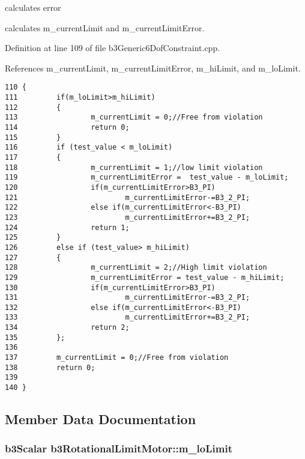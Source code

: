 calculates error 

calculates m\_\-currentLimit and m\_\-currentLimitError. 

Definition at line 109 of file b3Generic6DofConstraint.cpp.

References m\_\-currentLimit, m\_\-currentLimitError, m\_\-hiLimit, and m\_\-loLimit.

\begin{Code}\begin{verbatim}110 {
111         if(m_loLimit>m_hiLimit)
112         {
113                 m_currentLimit = 0;//Free from violation
114                 return 0;
115         }
116         if (test_value < m_loLimit)
117         {
118                 m_currentLimit = 1;//low limit violation
119                 m_currentLimitError =  test_value - m_loLimit;
120                 if(m_currentLimitError>B3_PI) 
121                         m_currentLimitError-=B3_2_PI;
122                 else if(m_currentLimitError<-B3_PI) 
123                         m_currentLimitError+=B3_2_PI;
124                 return 1;
125         }
126         else if (test_value> m_hiLimit)
127         {
128                 m_currentLimit = 2;//High limit violation
129                 m_currentLimitError = test_value - m_hiLimit;
130                 if(m_currentLimitError>B3_PI) 
131                         m_currentLimitError-=B3_2_PI;
132                 else if(m_currentLimitError<-B3_PI) 
133                         m_currentLimitError+=B3_2_PI;
134                 return 2;
135         };
136 
137         m_currentLimit = 0;//Free from violation
138         return 0;
139 
140 }
\end{verbatim}
\end{Code}




\subsection{Member Data Documentation}
\hypertarget{classb3_rotational_limit_motor_1ec51980cf1c20f39290b10f971ef378}{
\subsubsection[m\_\-loLimit]{\setlength{\rightskip}{0pt plus 5cm}b3Scalar {\bf b3RotationalLimitMotor::m\_\-loLimit}}}
\label{classb3_rotational_limit_motor_1ec51980cf1c20f39290b10f971ef378}



